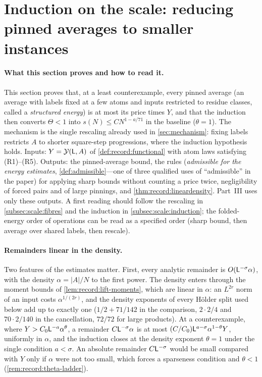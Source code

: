 \section{Induction on the scale: reducing pinned averages to smaller instances}
\label{sec:scale-comparison}

\paragraph{What this section proves and how to read it.}
This section proves that, at a least counterexample, every pinned
average (an average with labels fixed at a few atoms and inputs
restricted to residue classes, called a \emph{structured energy})
is at most its price times $Y$, and that the induction then converts
$\Theta<1$ into $s(N)\le CN^{1-a/71}$ in the baseline
($\theta=1$). The mechanism is the single rescaling already used in
\cref{sec:mechanism}: fixing labels restricts $A$ to shorter
square-step progressions, where the induction hypothesis holds.
Inputs: $Y=\mathcal Y(\mathsf L,A)$ of \cref{def:record:functional} with atom
laws satisfying (R1)--(R5). Outputs: the pinned-average bound, the
rules (\emph{admissible for the energy estimates},
\cref{def:admissible}---one of three qualified uses of
``admissible'' in the paper) for applying sharp bounds without
counting a price twice, negligibility of forced pairs and of large
pinnings, and \cref{thm:record:lineardensity}. Part~III uses only
these outputs. A first reading should follow the rescaling in
\cref{subsec:scale:fibres} and the induction in
\cref{subsec:scale:induction}; the folded-energy order of operations
can be read as a specified order (sharp bound, then average over
shared labels, then rescale).

\paragraph{Remainders linear in the density.}
Two features of the estimates matter. First, every analytic remainder is
$O(\mathsf L^{-\sigma}\alpha)$, with the density $\alpha=|A|/N$ to the first
power. The density enters through the moment bounds of
\cref{lem:record:lift-moments}, which are linear in $\alpha$: an $L^{2r}$
norm of an input costs $\alpha^{1/(2r)}$, and the density exponents of every
H\"older split used below add up to exactly one ($1/2+71/142$ in the
comparison, $2\cdot2/4$ and $70\cdot2/140$ in the cancellation, $72/72$ for
large products). At a counterexample, where $Y>C_0\mathsf L^{-a}\alpha^\theta$, a
remainder $C\mathsf L^{-\sigma}\alpha$ is at most
$(C/C_0)\mathsf L^{a-\sigma}\alpha^{1-\theta}Y$, uniformly in $\alpha$, and the
induction closes at the density exponent $\theta=1$ under the single
condition $a<\sigma$. An absolute remainder $C\mathsf L^{-\sigma}$ would be small compared
with $Y$ only if $\alpha$ were not too small, which forces a sparseness
condition and $\theta<1$ (\cref{rem:record:theta-ladder}).

